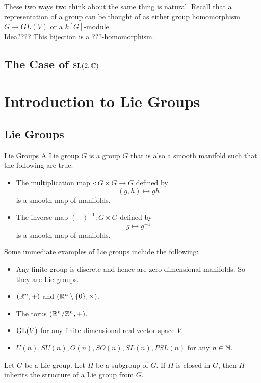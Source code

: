 \documentclass[a4paper]{article}
\begin{document}
These two ways two think about the same thing is natural. Recall that a representation of a group can be thought of as either group homomorphism $G\to GL(V)$ or a $k[G]$-module. \\

Idea???? This bijection is a ???-homomorphism. 

\subsection{The Case of $\text{SL}(2,\mathbb{C})$}

\pagebreak
\section{Introduction to Lie Groups}
\subsection{Lie Groups}
\begin{defn}{Lie Groups}{} A Lie group $G$ is a group $G$ that is also a smooth manifold such that the following are true. 
\begin{itemize}
\item The multiplication map $\cdot:G\times G\to G$ defined by $$(g,h)\mapsto gh$$ is a smooth map of manifolds. 
\item The inverse map $(-)^{-1}:G\times G$ defined by $$g\mapsto g^{-1}$$ is a smooth map of manifolds. 
\end{itemize}
\end{defn}

Some immediate examples of Lie groups include the following: 
\begin{itemize}
\item Any finite group is discrete and hence are zero-dimensional manifolds. So they are Lie groups. 
\item $(\mathbb{R}^n,+)$ and $(\mathbb{R}^n\setminus\{0\},\times)$. 
\item The torus $(\mathbb{R}^n/\mathbb{Z}^n,+)$. 
\item $\operatorname{GL}(V)$ for any finite dimensional real vector space $V$. 
\item $U(n), SU(n), O(n), SO(n), SL(n), PSL(n)$ for any $n\in\mathbb{N}$. 
\end{itemize}

\begin{prp}{}{} Let $G$ be a Lie group. Let $H$ be a subgroup of $G$. If $H$ is closed in $G$, then $H$ inherits the structure of a Lie group from $G$. 
\end{prp}
\end{document}
